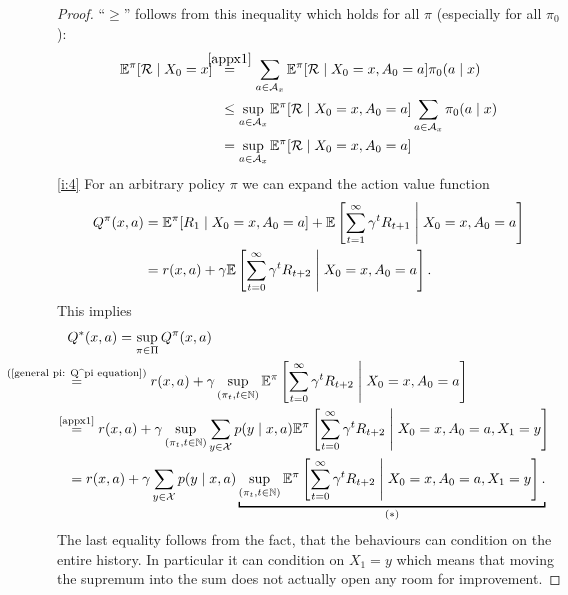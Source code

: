 \begin{proof}
	\noindent ``\(\geq\)'' follows from this inequality which holds for all \(\pi\) (especially for all \(\pi_0\)):
	\begin{align*}
		\E^\pi[\cR\mid X_0=x]\;\;
		&\lxeq{\ref{appx1}}\sum_{a\in\cA_x}\E^\pi[\cR \mid X_0=x,A_0=a]\pi_0(a\mid x)\\
		&\leq \sup_{a\in\cA_x}\E^\pi[\cR \mid X_0=x, A_0=a]\sum_{a\in\cA_x}\pi_0(a\mid x)\\
		&=\sup_{a\in\cA_x}\E^\pi[\cR \mid X_0=x, A_0=a]
	\end{align*}
	\ref{i:4} For an arbitrary policy \(\pi\) we can expand the action value function
	\begin{align}
		Q^\pi(x,a)&=\mathbb{E}^\pi[R_1\mid X_0=x, A_0=a]
		+\mathbb{E}\left[\sum_{t=1}^\infty \gamma^t R_{t+1}\;\middle|\; X_0=x,A_0=a\right]
		\nonumber\\
		&=r(x,a) + \gamma \mathbb{E}\left[\sum_{t=0}^\infty \gamma^t R_{t+2}\;\middle|\; X_0=x,A_0=a\right]. \label{general pi: Q^pi equation}
	\end{align}
	This implies
	\begin{align*}
		&Q^*(x,a)=\sup_{\pi\in\Pi} Q^\pi (x,a)
		\\
		&\lxeq{\text{(\ref{general pi: Q^pi equation})}} r(x,a)
		+ \gamma \sup_{(\pi_t,t\in\N)} \E^\pi\left[\sum_{t=0}^\infty \gamma^t R_{t+2}
		\;\middle|\; X_0=x,A_0=a \right]
		\\
		&\lxeq{\text{\ref{appx1}}}r(x,a)
		+\gamma \sup_{(\pi_t,t\in\N)} \sum_{y\in\cX} p(y\mid x, a)
		\E^\pi\left[\sum_{t=0}^\infty \gamma^t R_{t+2}\;\middle|\; X_0=x,A_0=a, X_1=y \right]
		\\
		&=r(x,a)
		+\gamma \sum_{y\in\cX} p(y\mid x, a) \underbracket[1pt]{
			\sup_{(\pi_t,t\in\N)}
			\E^\pi\left[\sum_{t=0}^\infty \gamma^t R_{t+2}\;\middle|\; X_0=x,A_0=a, X_1=y \right].
		}_{(*)}
	\end{align*}
	The last equality follows from the fact, that the behaviours can condition on the entire history. In particular it can condition on \(X_1=y\) which means that moving the supremum into the sum does not actually open any room for improvement. 


\end{proof}
